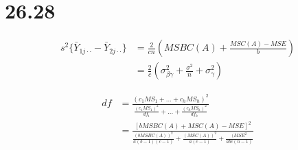 \documentclass{article}\usepackage[]{graphicx}\usepackage[]{color}
\begin{document}
\section{26.28}

\begin{displaymath}
\begin{split}
s^2 \{\bar{Y}_{1j\cdot\cdot}-\bar{Y}_{2j\cdot\cdot}\} &= \frac{2}{cn}(MSBC(A)+\frac{MSC(A)-MSE}{b})\\
                                                      &= \frac{2}{c}(\sigma^2_{\beta\gamma}+\frac{\sigma^2}{n}+\sigma^2_\gamma)
\end{split}
\end{displaymath}

\begin{displaymath}
\begin{split}
df & = \frac{(c_1MS_1+ ... + c_hMS_h)^2}{\frac{(c_1MS_1)^2}{df_1}+...+\frac{(c_hMS_h)^2}{df_h}}\\
   & = \frac{[bMSBC(A)+MSC(A)-MSE]^2}{\frac{(bMSBC(A))^2}{a(b-1)(c-1)}+\frac{(MSC(A))^2}{a(c-1)}+\frac{(MSE^2}{abc(n-1)}}
\end{split}
\end{displaymath}
\end{document}
